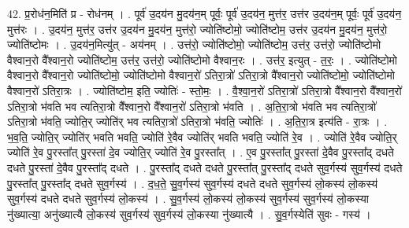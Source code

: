 \documentclass[17pt]{extarticle}
\begin{document}
42. प्र॒रोध॑न॒मिति॑ प्र - रोध॑नम् । . पूर्व॑ उ॒दय॑न मु॒दय॑न॒म् पूर्वः॒ पूर्व॑ उ॒दय॑न॒ मुत्त॑र॒ उत्त॑र उ॒दय॑न॒म् पूर्वः॒ पूर्व॑ उ॒दय॑न॒ मुत्त॑रः । . उ॒दय॑न॒ मुत्त॑र॒ उत्त॑र उ॒दय॑न मु॒दय॑न॒ मुत्त॑रो॒ ज्योति॑ष्टोमो॒ ज्योति॑ष्टोम॒ उत्त॑र उ॒दय॑न मु॒दय॑न॒ मुत्त॑रो॒ ज्योति॑ष्टोमः । . उ॒दय॑न॒मित्यु॑त् - अय॑नम् । . उत्त॑रो॒ ज्योति॑ष्टोमो॒ ज्योति॑ष्टोम॒ उत्त॑र॒ उत्त॑रो॒ ज्योति॑ष्टोमो वैश्वान॒रो वै᳚श्वान॒रो ज्योति॑ष्टोम॒ उत्त॑र॒ उत्त॑रो॒ ज्योति॑ष्टोमो वैश्वान॒रः । . उत्त॑र॒ इत्युत् - त॒रः॒ । . ज्योति॑ष्टोमो वैश्वान॒रो वै᳚श्वान॒रो ज्योति॑ष्टोमो॒ ज्योति॑ष्टोमो वैश्वान॒रो॑ ऽतिरा॒त्रो॑ ऽतिरा॒त्रो वै᳚श्वान॒रो ज्योति॑ष्टोमो॒ ज्योति॑ष्टोमो वैश्वान॒रो॑ ऽतिरा॒त्रः । . ज्योति॑ष्टोम॒ इति॒ ज्योतिः॑ - स्तो॒मः॒ । . वै॒श्वा॒न॒रो॑ ऽतिरा॒त्रो॑ ऽतिरा॒त्रो वै᳚श्वान॒रो वै᳚श्वान॒रो॑ ऽतिरा॒त्रो भ॑वति भव त्यतिरा॒त्रो वै᳚श्वान॒रो वै᳚श्वान॒रो॑ ऽतिरा॒त्रो भ॑वति । . अ॒ति॒रा॒त्रो भ॑वति भव त्यतिरा॒त्रो॑ ऽतिरा॒त्रो भ॑वति॒ ज्योति॒र् ज्योति॑र् भव त्यतिरा॒त्रो॑ ऽतिरा॒त्रो भ॑वति॒ ज्योतिः॑ । . अ॒ति॒रा॒त्र इत्य॑ति - रा॒त्रः । . भ॒व॒ति॒ ज्योति॒र् ज्योति॑र् भवति भवति॒ ज्योति॑ रे॒वैव ज्योति॑र् भवति भवति॒ ज्योति॑ रे॒व । . ज्योति॑ रे॒वैव ज्योति॒र् ज्योति॑ रे॒व पु॒रस्ता᳚त् पु॒रस्ता॑ दे॒व ज्योति॒र् ज्योति॑ रे॒व पु॒रस्ता᳚त् । . ए॒व पु॒रस्ता᳚त् पु॒रस्ता॑ दे॒वैव पु॒रस्ता᳚द् दधते दधते पु॒रस्ता॑ दे॒वैव पु॒रस्ता᳚द् दधते । . पु॒रस्ता᳚द् दधते दधते पु॒रस्ता᳚त् पु॒रस्ता᳚द् दधते सुव॒र्गस्य॑ सुव॒र्गस्य॑ दधते पु॒रस्ता᳚त् पु॒रस्ता᳚द् दधते सुव॒र्गस्य॑ । . द॒ध॒ते॒ सु॒व॒र्गस्य॑ सुव॒र्गस्य॑ दधते दधते सुव॒र्गस्य॑ लो॒कस्य॑ लो॒कस्य॑ सुव॒र्गस्य॑ दधते दधते सुव॒र्गस्य॑ लो॒कस्य॑ । . सु॒व॒र्गस्य॑ लो॒कस्य॑ लो॒कस्य॑ सुव॒र्गस्य॑ सुव॒र्गस्य॑ लो॒कस्या नु॑ख्यात्या॒ अनु॑ख्यात्यै लो॒कस्य॑ सुव॒र्गस्य॑ सुव॒र्गस्य॑ लो॒कस्या नु॑ख्यात्यै । . सु॒व॒र्गस्येति॑ सुवः - गस्य॑ । \newline
\end{document}
